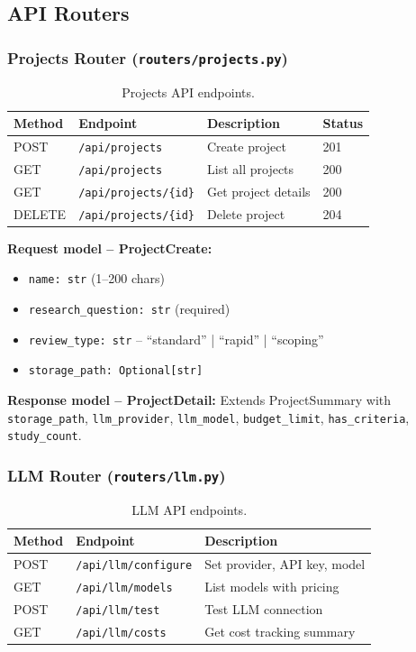 \documentclass[11pt,a4paper]{article}
\begin{document}
\subsection{API Routers}

\subsubsection{Projects Router (\texttt{routers/projects.py})}

\begin{table}[H]
\centering\small
\begin{tabular}{llp{5cm}l}
\toprule
\textbf{Method} & \textbf{Endpoint} & \textbf{Description} & \textbf{Status} \\
\midrule
POST & \texttt{/api/projects} & Create project & 201 \\
GET & \texttt{/api/projects} & List all projects & 200 \\
GET & \texttt{/api/projects/\{id\}} & Get project details & 200 \\
DELETE & \texttt{/api/projects/\{id\}} & Delete project & 204 \\
\bottomrule
\end{tabular}
\caption{Projects API endpoints.}
\end{table}

\textbf{Request model -- ProjectCreate:}
\begin{itemize}[nosep]
  \item \texttt{name: str} (1--200 chars)
  \item \texttt{research\_question: str} (required)
  \item \texttt{review\_type: str} -- ``standard'' | ``rapid'' | ``scoping''
  \item \texttt{storage\_path: Optional[str]}
\end{itemize}

\textbf{Response model -- ProjectDetail:} Extends ProjectSummary with \texttt{storage\_path}, \texttt{llm\_provider}, \texttt{llm\_model}, \texttt{budget\_limit}, \texttt{has\_criteria}, \texttt{study\_count}.

\subsubsection{LLM Router (\texttt{routers/llm.py})}

\begin{table}[H]
\centering\small
\begin{tabular}{llp{5cm}}
\toprule
\textbf{Method} & \textbf{Endpoint} & \textbf{Description} \\
\midrule
POST & \texttt{/api/llm/configure} & Set provider, API key, model \\
GET & \texttt{/api/llm/models} & List models with pricing \\
POST & \texttt{/api/llm/test} & Test LLM connection \\
GET & \texttt{/api/llm/costs} & Get cost tracking summary \\
\bottomrule
\end{tabular}
\caption{LLM API endpoints.}
\end{table}
\end{document}
